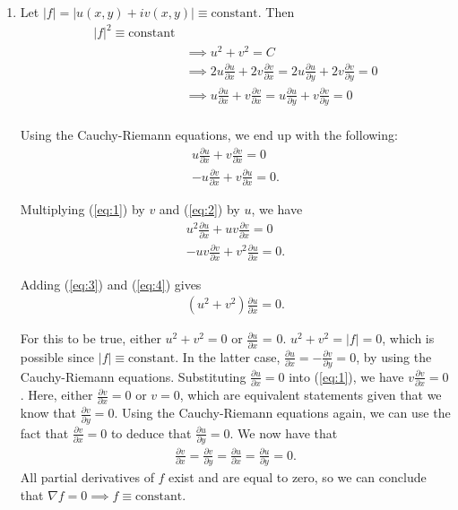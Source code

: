 \documentclass{article}
\begin{document}
\begin{enumerate}
\begin{enumerate}
\item 
Let $|f|  = |u(x,y) + iv(x,y)|\equiv \text{constant}$. Then
\begin{align*}
|f|^2 \equiv \text{constant} \\
&\implies u^2 + v^2 = C  \\
&\implies 2 u \frac{\partial u}{\partial x} + 2 v \frac{\partial v}{\partial x} = 2 u \frac{\partial u}{\partial y} + 2 v \frac{\partial v}{\partial y} =   0  \\
&\implies  u \frac{\partial u}{\partial x} +  v \frac{\partial v}{\partial x} =  u \frac{\partial u}{\partial y} +  v \frac{\partial v}{\partial y} =   0  \\
\end{align*}

Using the Cauchy-Riemann equations, we end up with the following:
\begin{align}
 u \frac{\partial u}{\partial x} +  v \frac{\partial v}{\partial x} = 0 \label{eq:1}  \\
 -u  \frac{\partial v}{\partial x} +  v \frac{\partial u}{\partial x} = 0.  \label{eq:2}
\end{align}

Multiplying (\ref{eq:1}) by $v$ and (\ref{eq:2}) by $u$, we have
\begin{align}
 u^2 \frac{\partial u}{\partial x} +  uv \frac{\partial v}{\partial x} = 0 \label{eq:3}  \\
 -uv  \frac{\partial v}{\partial x} +  v^2 \frac{\partial u}{\partial x} = 0.  \label{eq:4}
\end{align}

Adding (\ref{eq:3}) and (\ref{eq:4}) gives
\begin{align*}
(u^2 + v^2) \frac{\partial u}{\partial x} = 0.
\end{align*}

For this to be true,  either $u^2 + v^2 = 0$ or  $\frac{\partial u}{\partial x}$ = 0.  $u^2 + v^2 = |f| = 0$, which is possible since $|f| \equiv \text{constant}.$ In the latter case, $\frac{\partial u}{\partial x} = - \frac{\partial v}{\partial y} = 0$, by using the Cauchy-Riemann equations. Substituting $\frac{\partial u}{\partial x} = 0$ into (\ref{eq:1}), we have $v  \frac{\partial v}{\partial x} = 0$. Here, either $\frac{\partial v}{\partial x} = 0$ or $v = 0$, which are equivalent statements given that we know that $\frac{\partial v}{\partial y} = 0$. Using the Cauchy-Riemann equations again, we can use the fact that $\frac{\partial v}{\partial x} = 0$ to deduce that $\frac{\partial u}{\partial y} = 0$. We now have that
\begin{align*}
\frac{\partial v}{\partial x} = \frac{\partial v}{\partial y}  = \frac{\partial u}{\partial x}  = \frac{\partial u}{\partial y}  = 0.
\end{align*}
All partial derivatives of $f$ exist and are equal to zero, so we can conclude that $\nabla f = 0 \implies f \equiv \text{constant}$.


\end{enumerate}
\end{enumerate}
\end{document}
